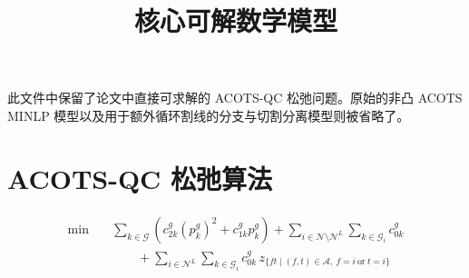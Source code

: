 \documentclass{article}
\title{核心可解数学模型}
\author{}
\date{}
\begin{document}
\maketitle

此文件中保留了论文中直接可求解的 ACOTS-QC 松弛问题。原始的非凸 ACOTS MINLP 模型以及用于额外循环割线的分支与切割分离模型则被省略了。

\section{ACOTS-QC 松弛算法}

\begin{equation}
\begin{aligned}
\min \quad
& \sum_{k\in\mathcal{G}} \left(c_{2k}^g (p_k^g)^2 + c_{1k}^g p_k^g\right)
+ \sum_{i\in\mathcal{N}\setminus\mathcal{N}^L} \sum_{k\in\mathcal{G}_i} c_{0k}^g \\
& \qquad
+ \sum_{i\in\mathcal{N}^L} \sum_{k\in\mathcal{G}_i} c_{0k}^g\,
z_{\{ft\mid (f,t)\in\mathcal{A},\ f=i\ \text{or}\ t=i\}}
\end{aligned}
\tag{11a}
\end{equation}
\end{document}
